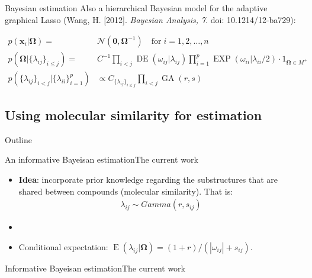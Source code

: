 \documentclass[xcolor=dvipsnames]{beamer}
\DeclareMathOperator{\EE}{E}
\DeclareMathOperator{\DE}{DE}
\DeclareMathOperator{\EXP}{EXP}
\DeclareMathOperator{\GA}{GA}
\begin{document}
\begin{frame}{Bayesian estimation}
	\vspace{-15.5pt}
	Also a hierarchical Bayesian model for the adaptive graphical Lasso (Wang, H. [2012]. \emph{Bayesian Analysis, 7}. doi: 10.1214/12-ba729):
	
	\begin{align*}
	p(\mathbf{x}_i|\boldsymbol{\Omega}) = & \mathcal{N}(\mathbf{0,\boldsymbol{\Omega}}^{-1}) \quad \text{for} \; i=1,2,\hdots,n\\
	p(\boldsymbol{\Omega}|\{\lambda_{ij}\}_{i\leq j}) = & C^{-1} \prod_{i<j} \DE(\omega_{ij}|\lambda_{ij}) \prod_{i=1}^{p} \EXP (\omega_{ii} | \lambda_{ii} / 2) \cdot 1_{\boldsymbol{\Omega}\in M^+}\\
	p(\{\lambda_{ij}\}_{i<j}|\{\lambda_{ii}\}_{i=1}^p) &\propto C_{\{\lambda_{ij}\}_{i\leq j}} \prod_{i<j} \GA(r,s)
	\end{align*}
\end{frame}

\subsection{Using molecular similarity for estimation}
\begin{frame}{Outline}
	\vspace{-10.5pt}
	\tableofcontents[currentsection,subsectionstyle=show/shaded/hide]
\end{frame}
\begin{frame}{An informative Bayeisan estimation}{The current work}
	\vspace{-15.5pt}
	\begin{itemize}
		\item \textbf{Idea}:  incorporate prior knowledge regarding the substructures that are shared between compounds (molecular similarity). That is:
		\begin{align*}
			\lambda_{ij}\sim Gamma(r,s_{ij})
		\end{align*}
		\item[]
		\item Conditional expectation: $\EE(\lambda_{ij}|\boldsymbol{\Omega})=(1+r)/(|\omega_{ij} |+s_{ij})$.
	\end{itemize}
\end{frame}

\begin{frame}{Informative Bayeisan estimation}{The current work}
	\begin{center}
	\end{center}
\end{frame}
\end{document}
